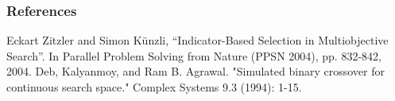 \documentclass[10pt]{beamer}
\begin{document}
    
  
\begin{frame}[allowframebreaks]
  \frametitle<presentation>{References}    
\begin{thebibliography}{}
\beamertemplatearticlebibitems
{} Eckart Zitzler and Simon Künzli, “Indicator-Based Selection in Multiobjective Search”. In Parallel Problem Solving from Nature (PPSN 2004), pp. 832-842, 2004.
 Deb, Kalyanmoy, and Ram B. Agrawal. "Simulated binary crossover for continuous search space." Complex Systems 9.3 (1994): 1-15.
\end{thebibliography}
\end{frame}
\end{document}
